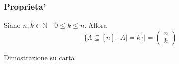 \documentclass{article}
\begin{document}
      \subsubsection{Proprieta'}
      \begin{flushleft}
        Siano $n,k \in \mathbb{N} \quad 0 \leq k \leq n$. Allora
        \begin{equation}
          \mid \{ A \subseteq [n]: \mid A \mid = k\} \mid = \begin{pmatrix}
            n \\ 
            k
          \end{pmatrix}
        \end{equation}
      \end{flushleft}
      \begin{flushleft}
        Dimostrazione su carta
      \end{flushleft}
\end{document}
